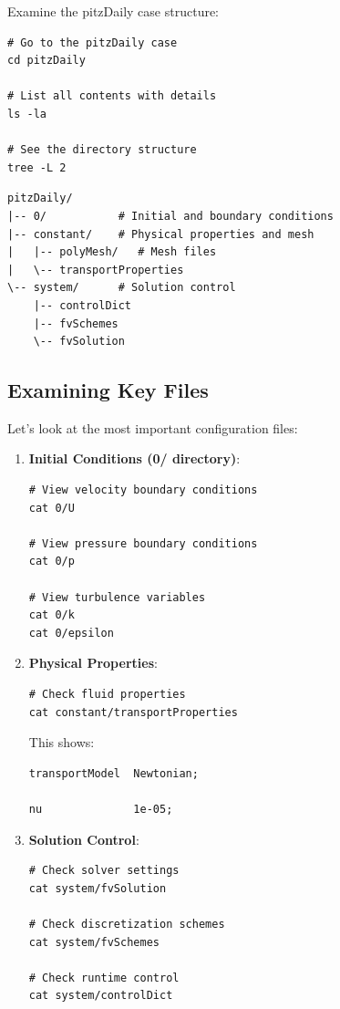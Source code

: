 \documentclass[
    parskip=half,      %
    DIV=12,            %
    headings=normal,   %
    fontsize=11pt,     %
    english            %
]{scrartcl}
\begin{document}

Examine the pitzDaily case structure:

\begin{lstlisting}[style=terminal]
# Go to the pitzDaily case
cd pitzDaily

# List all contents with details
ls -la

# See the directory structure
tree -L 2
\end{lstlisting}

\begin{lstlisting}[style=openfoam]
pitzDaily/
|-- 0/           # Initial and boundary conditions
|-- constant/    # Physical properties and mesh
|   |-- polyMesh/   # Mesh files
|   \-- transportProperties
\-- system/      # Solution control
    |-- controlDict
    |-- fvSchemes
    \-- fvSolution
\end{lstlisting}

\subsection{Examining Key Files}
Let's look at the most important configuration files:

\begin{enumerate}
	\renewcommand{\labelenumi}{\textbf{Step \arabic{enumi}:}}
\item \textbf{Initial Conditions (0/ directory)}:
\begin{lstlisting}[style=terminal]
# View velocity boundary conditions
cat 0/U

# View pressure boundary conditions  
cat 0/p

# View turbulence variables
cat 0/k
cat 0/epsilon
\end{lstlisting}

\item \textbf{Physical Properties}:
\begin{lstlisting}[style=terminal]
# Check fluid properties
cat constant/transportProperties
\end{lstlisting}

This shows:
\begin{lstlisting}[style=openfoam]
transportModel  Newtonian;

nu              1e-05;
\end{lstlisting}

\item \textbf{Solution Control}:
\begin{lstlisting}[style=terminal]
# Check solver settings
cat system/fvSolution

# Check discretization schemes
cat system/fvSchemes

# Check runtime control
cat system/controlDict
\end{lstlisting}
\end{enumerate}
\end{document}
